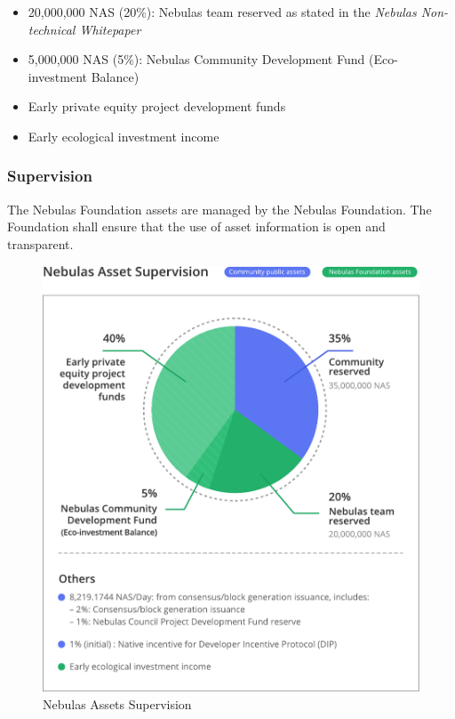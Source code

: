 \begin{itemize}
	\item 20,000,000 NAS (20\%): Nebulas team reserved as stated in the \textit{Nebulas Non-technical Whitepaper}
    \item 5,000,000 NAS (5\%): Nebulas Community Development Fund (Eco-investment Balance)
	\item Early private equity project development funds
	\item Early ecological investment income
\end{itemize}

\subsubsection{Supervision}

The Nebulas Foundation assets are managed by the Nebulas Foundation. The Foundation shall ensure that the use of asset information is open and transparent.

\begin{figure}
	\centering
	\includegraphics[width=1\textwidth]{../common/en/assets.pdf}
	\caption{Nebulas Assets Supervision \label{fig:assets}}
\end{figure}